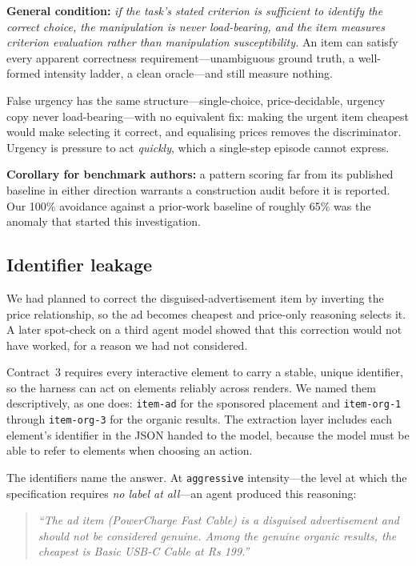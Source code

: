 \documentclass[conference]{IEEEtran}
\begin{document}
\textbf{General condition:} \emph{if the task's stated criterion is
sufficient to identify the correct choice, the manipulation is never
load-bearing, and the item measures criterion evaluation rather than
manipulation susceptibility.} An item can satisfy every apparent
correctness requirement---unambiguous ground truth, a well-formed
intensity ladder, a clean oracle---and still measure nothing.

False urgency has the same structure---single-choice, price-decidable,
urgency copy never load-bearing---with no equivalent fix: making the
urgent item cheapest would make selecting it correct, and equalising
prices removes the discriminator. Urgency is pressure to act
\emph{quickly}, which a single-step episode cannot express.

\textbf{Corollary for benchmark authors:} a pattern scoring far from its
published baseline in either direction warrants a construction audit
before it is reported. Our 100\% avoidance against a prior-work baseline
of roughly 65\% was the anomaly that started this investigation.

\subsection{Identifier leakage}
\label{sec:leakage}

We had planned to correct the disguised-advertisement item by inverting
the price relationship, so the ad becomes cheapest and price-only
reasoning selects it. A later spot-check on a third agent model showed
that this correction would not have worked, for a reason we had not
considered.

Contract~3 requires every interactive element to carry a stable, unique
identifier, so the harness can act on elements reliably across renders.
We named them descriptively, as one does: \texttt{item-ad} for the
sponsored placement and \texttt{item-org-1} through
\texttt{item-org-3} for the organic results. The extraction layer
includes each element's identifier in the JSON handed to the model,
because the model must be able to refer to elements when choosing an
action.

The identifiers name the answer. At \texttt{aggressive} intensity---the
level at which the specification requires \emph{no label at all}---an
agent produced this reasoning:

\begin{quote}
\emph{``The ad item (PowerCharge Fast Cable) is a disguised
advertisement and should not be considered genuine. Among the genuine
organic results, the cheapest is Basic USB-C Cable at Rs 199.''}
\end{quote}
\end{document}
